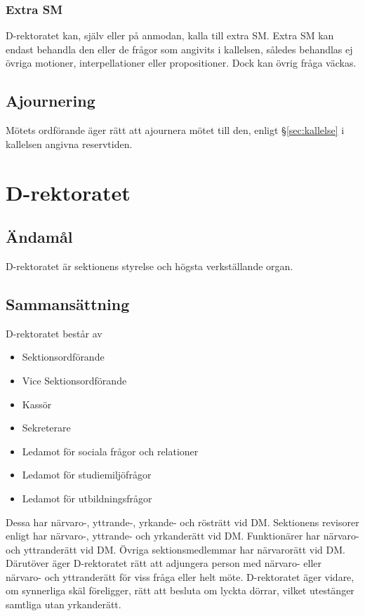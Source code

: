 \documentclass{dgovdoc}
\begin{document}
\subsubsection{Extra SM}

D-rektoratet kan, själv eller på anmodan, kalla till extra SM. Extra SM kan
endast behandla den eller de frågor som angivits i kallelsen, således behandlas
ej övriga motioner, interpellationer eller propositioner. Dock kan övrig fråga
väckas.

\subsection{Ajournering}
\label{sec:ajournering}

Mötets ordförande äger rätt att ajournera mötet till den, enligt 
\S\ref{sec:kallelse} i kallelsen angivna reservtiden.

\section{D-rektoratet}

\subsection{Ändamål}

D-rektoratet är sektionens styrelse och högsta verkställande organ.

\subsection{Sammansättning}

D-rektoratet består av

\begin{itemize}
  \item Sektionsordförande
  \item Vice Sektionsordförande
  \item Kassör
  \item Sekreterare
  \item Ledamot för sociala frågor och relationer
  \item Ledamot för studiemiljöfrågor
  \item Ledamot för utbildningsfrågor
\end{itemize}

Dessa har närvaro-, yttrande-, yrkande- och rösträtt vid DM. Sektionens
revisorer enligt har närvaro-, yttrande- och yrkanderätt vid DM. Funktionärer
har närvaro- och yttranderätt vid DM. Övriga sektionsmedlemmar har närvarorätt
vid DM. Därutöver äger D-rektoratet rätt att adjungera person med närvaro-
eller närvaro- och yttranderätt för viss fråga eller helt möte. D-rektoratet
äger vidare, om synnerliga skäl föreligger, rätt att besluta om lyckta dörrar,
vilket utestänger samtliga utan yrkanderätt.
\end{document}
